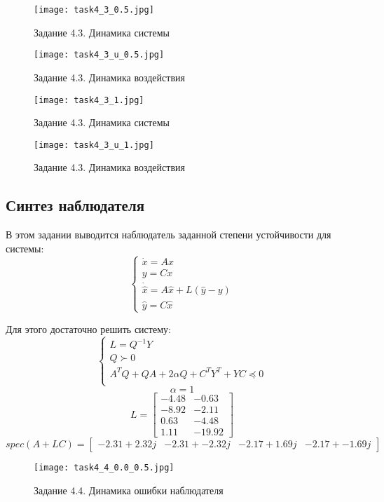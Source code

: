 \begin{figure}[]
    \centering
    \texttt{[image: task4\_3\_0.5.jpg]}
    \caption{Задание 4.3. Динамика системы}
    \label{fig:task4_3_0.5}
\end{figure}
\begin{figure}[]
    \centering
    \texttt{[image: task4\_3\_u\_0.5.jpg]}
    \caption{Задание 4.3. Динамика воздействия}
    \label{fig:task4_3_u_0.5}
\end{figure}

\begin{figure}[]
    \centering
    \texttt{[image: task4\_3\_1.jpg]}
    \caption{Задание 4.3. Динамика системы}
    \label{fig:task4_3_1}
\end{figure}
\begin{figure}[]
    \centering
    \texttt{[image: task4\_3\_u\_1.jpg]}
    \caption{Задание 4.3. Динамика воздействия}
    \label{fig:task4_3_u_1}
\end{figure}


\subsection{Синтез наблюдателя}

В этом задании выводится наблюдатель заданной степени устойчивости для системы:
\[
        \begin{cases}
                \dot{x} = A x \\
                y = C x \\
                \dot{\hat{x}} = A \hat{x} + L(\hat{y} - y) \\
                \hat{y} = C \hat{x}
        \end{cases} 
\]

Для этого достаточно решить систему:
\[
        \begin{cases}
                L = Q^{-1}Y\\
                Q \succ 0 \\
                A^TQ + QA + 2 \alpha Q + C^T Y^T + YC \preccurlyeq 0  \\
        \end{cases} 
\]
\[ \alpha = 1\]
\[L = \begin{bmatrix}
 -4.48 & -0.63\\
 -8.92 & -2.11\\
  0.63 & -4.48\\
  1.11 & -19.92
\end{bmatrix}\]
\[spec(A + LC) = \begin{bmatrix}
 -2.31 + 2.32j & -2.31 + -2.32j & -2.17 + 1.69j & -2.17 + -1.69j
\end{bmatrix}\]
\begin{figure}[]
    \centering
    \texttt{[image: task4\_4\_0.0\_0.5.jpg]}
    \caption{Задание 4.4. Динамика ошибки наблюдателя}
    \label{fig:task4_4_1}
\end{figure}

